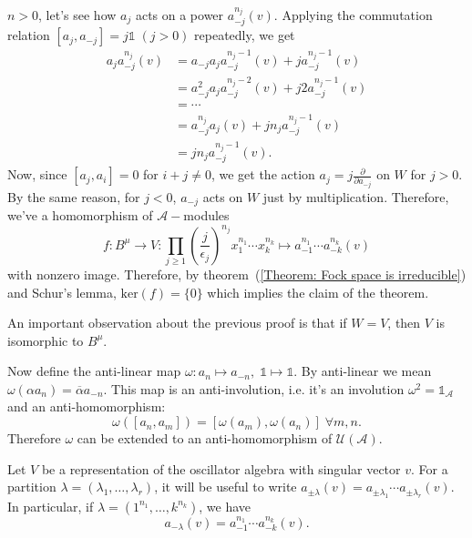  $n>0$, let's see how $a_j$ acts on a power $a_{-j}^{n_j}(v)$. Applying the commutation relation $[a_j,a_{-j}]=j\mathds{1}\;(j>0)$ repeatedly, we get
\begin{equation}
    \begin{split}
        a_ja_{-j}^{n_j}(v) &= a_{-j}a_ja_{-j}^{n_j-1}(v)+ja_{-j}^{n_j-1}(v)\\
        &=a_{-j}^2a_ja_{-j}^{n_j-2}(v)+j2a_{-j}^{n_j-1}(v)\\
        &=\cdots\\
        &=a_{-j}^{n_j}a_j(v)+jn_ja_{-j}^{n_j-1}(v)\\
        &=jn_ja_{-j}^{n_j-1}(v).
    \end{split}
\end{equation}
Now, since $[a_j,a_i]=0$ for $i+j\neq0$, we get the action $a_j=j\frac{\partial}{\partial a_{-j}}$ on $W$ for $j>0$. By the same reason, for $j<0$, $a_{-j}$ acts on $W$ just by multiplication. Therefore, we've a homomorphism of $\mathcal{A}-$modules 
\begin{equation}
    f:B^\mu\rightarrow V:\prod_{j\geq1}\left(\frac{j}{\epsilon_j}\right)^{n_j}x_1^{n_1}\cdots x_k^{n_k}\mapsto a_{-1}^{n_1}\cdots a_{-k}^{n_k}(v)
\end{equation}
 with nonzero image. Therefore, by theorem~(\ref{Theorem: Fock space is irreducible}) and Schur's lemma, $\text{ker}(f)=\{0\}$ which implies the claim of the theorem.\par
An important observation about the previous proof is that if $W=V$, then $V$ is isomorphic to $B^\mu$.\par

Now define the anti-linear map $\omega:a_n\mapsto a_{-n},\;\mathds{1}\mapsto \mathds{1}$. By anti-linear we mean $\omega(\alpha a_n)=\overline{\alpha}a_{-n}$. This map is an anti-involution, i.e. it's an involution $\omega^2=\mathds{1}_{\mathcal{A}}$ and an anti-homomorphism: 
\begin{equation}
    \omega([a_n,a_{m}])=[\omega(a_m),\omega(a_{n})]\;\forall m,n.
\end{equation}
Therefore $\omega$ can be extended to an anti-homomorphism of $\mathcal{U}(\mathcal{A})$. \begin{dang}
    \begin{notation}
       Let $V$ be a representation of the oscillator algebra with singular vector $v$. For a partition $\lambda=(\lambda_1,\dots,\lambda_r)$, it will be useful to write $a_{\pm\lambda}(v)=a_{\pm\lambda_1}\cdots a_{\pm\lambda_r}(v)$. In particular, if $\lambda =(1^{n_1},\dots ,k^{n_k})$, we have
       \begin{equation}
           a_{-\lambda}(v)=a_{-1}^{n_1}\cdots a_{-k}^{n_k}(v).
       \end{equation}
    \end{notation}
\end{dang}


